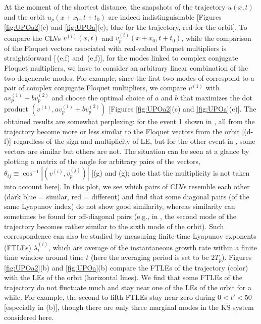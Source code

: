 At the moment of the shortest distance,
the snapshots of the trajectory $u(x,t)$
and the orbit $u_p(x+x_0,t+t_0)$
are indeed indistinguishable
[Figures \ref{fig:UPOa2}(c) and \ref{fig:UPOa}(c);
blue for the trajectory, red for the orbit].
To compare the CLVs $v^{(i)}(x,t)$ and $v_p^{(i)}(x+x_0,t+t_0)$,
while the comparison of the Floquet vectors associated with
real-valued Floquet multipliers is straightforward
[\,(e,f) and \,(e,f)],
for the modes linked to complex conjugate Floquet multipliers,
we have to consider an arbitrary linear combination
of the two degenerate modes.
For example, since the first two modes of 
correspond to a pair of complex conjugate Floquet multipliers,
we compare $v^{(1)}$ with $av_p^{(1)} + bv_p^{(2)}$
and choose the optimal choice of $a$ and $b$ that maximizes
the dot product $(v^{(1)}, av_p^{(1)} + bv_p^{(2)})$
[Figures \ref{fig:UPOa2}(c) and \ref{fig:UPOa}(c)].
The obtained results are somewhat perplexing:
for the event 1 shown in ,
all {\cLvs} from the trajectory
become more or less similar to the Floquet vectors from the orbit
[(d-f)]
regardless of the sign and multiplicity of LE,
but for the other event in ,
some vectors are similar but others are not.
The situation can be seen at a glance
by plotting a matrix of the angle for arbitrary pairs of the vectors,
$\theta_{ij} \equiv \cos^{-1}|(v^{(i)}, v_p^{(j)})|$
[(g) and (g);
note that the multiplicity is not taken into account here].
In this plot, we see which pairs of CLVs resemble each other
(dark blue = similar, red = different)
and find that some diagonal pairs (of the same Lyapunov index)
do not show good similarity, whereas similarity can sometimes be found
for off-diagonal pairs
(e.g., in , the second mode of the trajectory becomes
rather similar to the sixth mode of the orbit).
Such correspondence can also be studied
by measuring finite-time Lyapunov exponents (FTLEs) $\lambda_t^{(i)}$,
which are average of the instantaneous growth rate within a finite time window
around time $t$ (here the averaging period is set to be $2T_p$).
Figures \ref{fig:UPOa2}(b) and \ref{fig:UPOa}(b) compare
the FTLEs of the trajectory (color)
with the LEs of the orbit (horizontal lines).
We find that some FTLEs of the trajectory do not fluctuate much
and stay near one of the LEs of the orbit for a while.
For example, the second to fifth FTLEs stay near zero
during $0 < t' < 50$ [especially in (b)],
though there are only three marginal modes in the KS system considered here.
